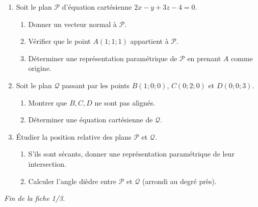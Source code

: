 \documentclass[11pt]{article}
\begin{document}
\begin{exercice}
\begin{enumerate}
    \item Soit le plan $\mathscr{P}$ d'équation cartésienne $2x - y + 3z - 4 = 0$.
    \begin{enumerate}
        \item Donner un vecteur normal à $\mathscr{P}$.
        \item Vérifier que le point $A(1;1;1)$ appartient à $\mathscr{P}$.
        \item Déterminer une représentation paramétrique de $\mathscr{P}$ en prenant $A$ comme origine.
    \end{enumerate}
    
    \item Soit le plan $\mathscr{Q}$ passant par les points $B(1;0;0)$, $C(0;2;0)$ et $D(0;0;3)$.
    \begin{enumerate}
        \item Montrer que $B, C, D$ ne sont pas alignés.
        \item Déterminer une équation cartésienne de $\mathscr{Q}$.
    \end{enumerate}
    
    \item Étudier la position relative des plans $\mathscr{P}$ et $\mathscr{Q}$.
    \begin{enumerate}
        \item S'ils sont sécants, donner une représentation paramétrique de leur intersection.
        \item Calculer l'angle dièdre entre $\mathscr{P}$ et $\mathscr{Q}$ (arrondi au degré près).
    \end{enumerate}
\end{enumerate}
\end{exercice}

\vspace{1cm}
\noindent \hrulefill
\noindent \textit{Fin de la fiche 1/3.}
\end{document}
